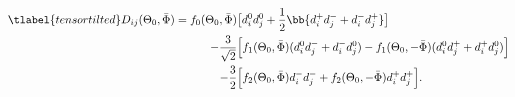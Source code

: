 \begin{align} \tlabel{tensortilted}
    D_{ij}(\Theta_0, \bar\Phi) = f_0(\Theta_0, \bar \Phi) &\big[ d_i^0 d_j^0 + \frac{1}{2}\bb{d_i^+ d_j^- + d_i^- d_j^+} \big] \\
      \qquad-\frac{3}{\sqrt{2}} &\Big[ f_1(\Theta_0, \bar \Phi)  (d_i^0 d_j^- + d_i^- d_j^0) - f_1(\Theta_0, -\bar \Phi) (d_i^0 d_j^+ + d_i^+ d_j^0) \Big]\\
      \qquad-\frac{3}{2} &\Big[ f_2(\Theta_0, \bar \Phi) d_i^- d_j^- + f_2(\Theta_0, -\bar \Phi) d_i^+ d_j^+\Big].
\end{align}


